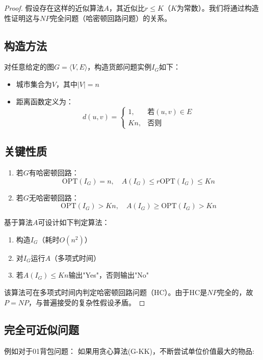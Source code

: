 \documentclass[./../main.tex]{subfiles} %
\begin{document}
\begin{proof}
假设存在这样的近似算法$A$，其近似比$r \leq K$（$K$为常数）。我们将通过构造性证明这与$NP$完全问题（哈密顿回路问题）的关系。

\subsection*{构造方法}
对任意给定的图$G=\langle V,E \rangle$，构造货郎问题实例$I_G$如下：
\begin{itemize}
    \item 城市集合为$V$，其中$|V|=n$
    \item 距离函数定义为：
    $$
    d(u,v) = 
    \begin{cases}
    1, & \text{若}(u,v)\in E \\
    Kn, & \text{否则}
    \end{cases}
    $$
\end{itemize}

\subsection*{关键性质}
\begin{enumerate}
    \item 若$G$有哈密顿回路：
    $$
    \text{OPT}(I_G) = n, \quad A(I_G) \leq r\text{OPT}(I_G) \leq Kn
    $$
    
    \item 若$G$无哈密顿回路：
    $$
    \text{OPT}(I_G) > Kn, \quad A(I_G) \geq \text{OPT}(I_G) > Kn
    $$
\end{enumerate}

基于算法$A$可设计如下判定算法：
\begin{enumerate}
    \item 构造$I_G$（耗时$O(n^2)$）
    \item 对$I_G$运行$A$（多项式时间）
    \item 若$A(I_G)\leq Kn$输出"Yes"，否则输出"No"
\end{enumerate}

该算法可在多项式时间内判定哈密顿回路问题（HC）。由于HC是$NP$完全的，故$P=NP$，与普遍接受的复杂性假设矛盾。
\end{proof}


\subsection{完全可近似问题}
例如对于01背包问题：
如果用贪心算法(G-KK)，不断尝试单位价值最大的物品:
\end{document}
